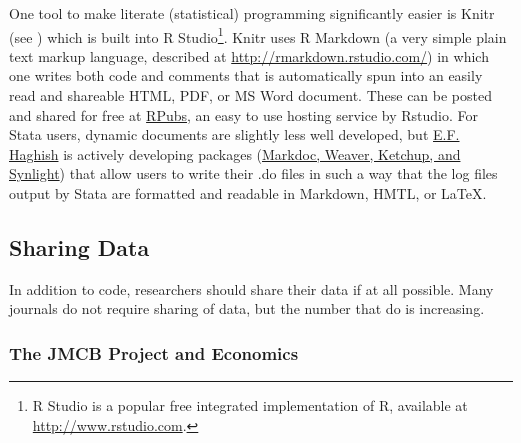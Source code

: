 \documentclass[12pt] {article}
\begin{document}
One tool to make literate (statistical) programming significantly easier
is Knitr (see \cite{xie_dynamic_2013, xie_knitr:_2014}) which is built into R
Studio\footnote{R Studio is a popular free integrated implementation of
  R, available at \href{stylesWithEffects.xml}{http://www.rstudio.com}.}.
Knitr uses R Markdown (a very simple plain text markup language,
described at \url{http://rmarkdown.rstudio.com/}) in which one writes
both code and comments that is automatically spun into an easily read
and shareable HTML, PDF, or MS Word document. These can be posted and
shared for free at \href{https://rpubs.com}{RPubs}, an easy to use
hosting service by Rstudio. For Stata users, dynamic documents are slightly less well developed, but \href{http://www.haghish.com}{E.F. Haghish} is actively developing packages (\href{http://www.haghish.com/statistics/stata-blog/reproducible-research/packages.php}{Markdoc, Weaver, Ketchup, and Synlight}) that allow users to write their .do files in such a way that the log files output by Stata are formatted and readable in Markdown, HMTL, or \LaTeX . 



\subsection{Sharing Data}\label{sharing-data}

In addition to code, researchers should share their data if at all
possible. Many journals do not require sharing of data, but the number
that do is increasing.

\subsubsection{The JMCB Project and
Economics}\label{the-jmcb-project-and-economics}
\end{document}
